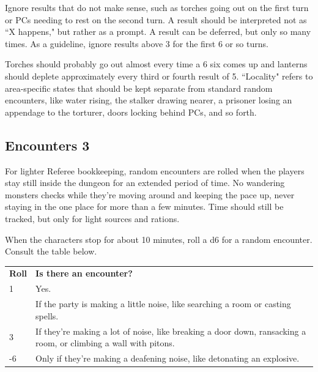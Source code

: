 \documentclass[twoside]{article}
\begin{document}
\bigbreak

Ignore results that do not make sense, such as torches going out on the first turn or PCs needing to rest on the second turn. A result should be interpreted not as ``X happens," but rather as a prompt. A result can be deferred, but only so many times. As a guideline, ignore results above 3 for the first 6 or so turns.

\bigbreak

Torches should probably go out almost every time a 6 six comes up and lanterns should deplete approximately every third or fourth result of 5. ``Locality" refers to area-specific states that should be kept separate from standard random encounters, like water rising, the stalker drawing nearer, a prisoner losing an appendage to the torturer, doors locking behind PCs, and so forth.

\subsection*{Encounters 3}

For lighter Referee bookkeeping, random encounters are rolled when the players stay still inside the dungeon for an extended period of time. No wandering monsters checks while they're moving around and keeping the pace up, never staying in the one place for more than a few minutes. Time should still be tracked, but only for light sources and rations.

\bigbreak

When the characters stop for about 10 minutes, roll a d6 for a random encounter. Consult the table below.

\bigbreak

\begin{center}
\noindent\begin{tabular}{>{\centering\arraybackslash}p{}p{}}
\textbf{Roll}&\textbf{Is there an encounter?}\\
\rowcolor[gray]{0.75}1&Yes.\\
2&If the party is making a little noise, like searching a room or casting spells.\\
\rowcolor[gray]{0.75}3&If they're making a lot of noise, like breaking a door down, ransacking a room, or climbing a wall with pitons.\\
4-6&Only if they're making a deafening noise, like detonating an explosive.\\
\end{tabular}
\end{center}
\end{document}
